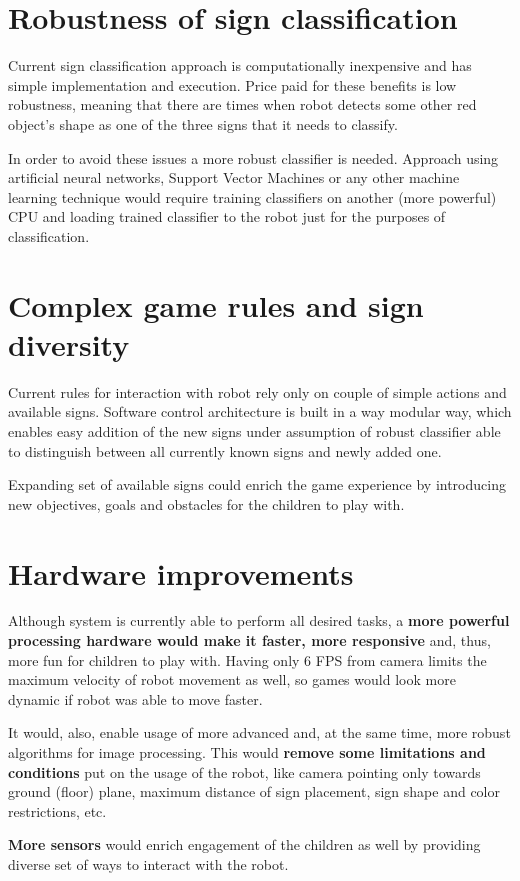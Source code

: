 
\section{Robustness of sign classification}

Current sign classification approach is computationally inexpensive and has simple implementation and execution. Price paid for these benefits is low robustness, meaning that there are times when robot detects some other red object's shape as one of the three signs that it needs to classify.

In order to avoid these issues a more robust classifier is needed. Approach using artificial neural networks, Support Vector Machines or any other machine learning technique would require training classifiers on another (more powerful) CPU and loading trained classifier to the robot just for the purposes of classification.

\section{Complex game rules and sign diversity}

Current rules for interaction with robot rely only on couple of simple actions and available signs. Software control architecture is built in a way modular way, which enables easy addition of the new signs under assumption of robust classifier able to distinguish between all currently known signs and newly added one.

Expanding set of available signs could enrich the game experience by introducing new objectives, goals and obstacles for the children to play with.

\section{Hardware improvements}

Although system is currently able to perform all desired tasks, a \textbf{more powerful processing hardware would make it faster, more responsive} and, thus, more fun for children to play with. Having only 6 FPS from camera limits the maximum velocity of robot movement as well, so games would look more dynamic if robot was able to move faster. 

It would, also, enable usage of more advanced and, at the same time, more robust algorithms for image processing. This would \textbf{remove some limitations and conditions} put on the usage of the robot, like camera pointing only towards ground (floor) plane, maximum distance of sign placement, sign shape and color restrictions, etc.

\textbf{More sensors} would enrich engagement of the children as well by providing diverse set of ways to interact with the robot. 


